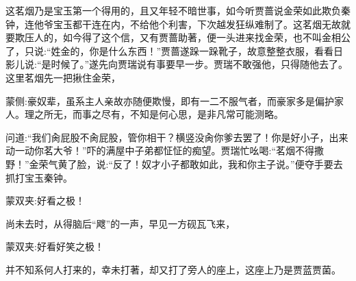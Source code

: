 \begin{parag}
    这茗烟乃是宝玉第一个得用的，且又年轻不暗世事，如今听贾蔷说金荣如此欺负秦钟，连他爷宝玉都干连在内，不给他个利害，下次越发狂纵难制了。这茗烟无故就要欺压人的，如今得了这个信，又有贾蔷助著，便一头进来找金荣，也不叫金相公了，只说:“姓金的，你是什么东西！”贾蔷遂跺一跺靴子，故意整整衣服，看看日影儿说:“是时候了。”遂先向贾瑞说有事要早一步。贾瑞不敢强他，只得随他去了。这里茗烟先一把揪住金荣，\begin{note}蒙侧:豪奴辈，虽系主人亲故亦随便欺慢，即有一二不服气者，而豪家多是偏护家人。理之所无，而事之尽有，不知是何心思，是非凡常可能测略。\end{note}问道:“我们肏屁股不肏屁股，管你相干？横竖没肏你爹去罢了！你是好小子，出来动一动你茗大爷！”吓的满屋中子弟都怔怔的痴望。贾瑞忙吆喝:“茗烟不得撒野！”金荣气黄了脸，说:“反了！奴才小子都敢如此，我和你主子说。”便夺手要去抓打宝玉秦钟。\begin{note}蒙双夹:好看之极！\end{note}尚未去时，从得脑后“飕”的一声，早见一方砚瓦飞来，\begin{note}蒙双夹:好看好笑之极！\end{note}并不知系何人打来的，幸未打著，却又打了旁人的座上，这座上乃是贾蓝贾菌。
\end{parag}


